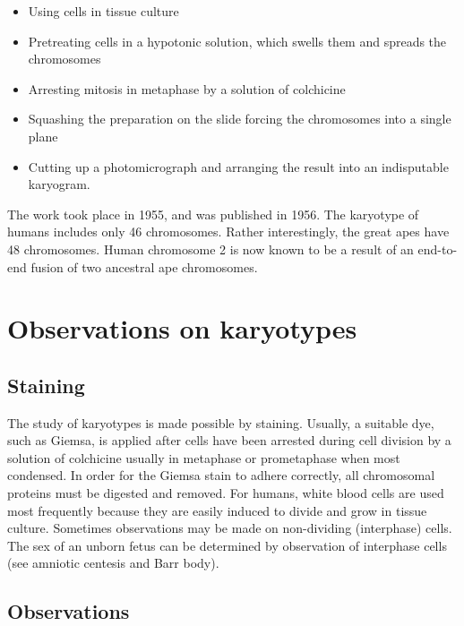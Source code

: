 \documentclass[]{book}
\providecommand{\tightlist}{%
  \setlength{\itemsep}{0pt}\setlength{\parskip}{0pt}}
\begin{document}
\begin{itemize}
\tightlist
\item
  Using cells in tissue culture
\item
  Pretreating cells in a hypotonic solution, which swells them and spreads the chromosomes
\item
  Arresting mitosis in metaphase by a solution of colchicine
\item
  Squashing the preparation on the slide forcing the chromosomes into a single plane
\item
  Cutting up a photomicrograph and arranging the result into an indisputable karyogram.
\end{itemize}

The work took place in 1955, and was published in 1956. The karyotype of humans includes only 46 chromosomes. Rather interestingly, the great apes have 48 chromosomes. Human chromosome 2 is now known to be a result of an end-to-end fusion of two ancestral ape chromosomes.

\hypertarget{observations-on-karyotypes}{%
\section{Observations on karyotypes}\label{observations-on-karyotypes}}

\hypertarget{staining}{%
\subsection{Staining}\label{staining}}

The study of karyotypes is made possible by staining. Usually, a suitable dye, such as Giemsa, is applied after cells have been arrested during cell division by a solution of colchicine usually in metaphase or prometaphase when most condensed. In order for the Giemsa stain to adhere correctly, all chromosomal proteins must be digested and removed. For humans, white blood cells are used most frequently because they are easily induced to divide and grow in tissue culture. Sometimes observations may be made on non-dividing (interphase) cells. The sex of an unborn fetus can be determined by observation of interphase cells (see amniotic centesis and Barr body).

\hypertarget{observations}{%
\subsection{Observations}\label{observations}}
\end{document}
